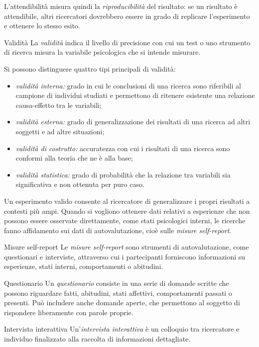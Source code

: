 \documentclass[a4paper]{article}
\begin{document}
L'attendibilità misura quindi la \emph{riproducibilità} del risultato: se un risultato è attendibile, altri ricercatori dovrebbero essere in grado di replicare l'esperimento e ottenere lo stesso esito.
\begin{snippetdefinition}{Validità}
    La \emph{validità} indica il livello di precisione con cui un test o uno strumento di ricerca misura la variabile psicologica che si intende misurare.
\end{snippetdefinition}
Si possono distinguere quattro tipi principali di validità:
\begin{itemize}
    \item \emph{validità interna:} grado in cui le conclusioni di una ricerca sono riferibili al campione di individui studiati e permettono di ritenere esistente una relazione causa-effetto tra le variabili;
    \item \emph{validità esterna:} grado di generalizzazione dei risultati di una ricerca ad altri soggetti e ad altre situazioni;
    \item \emph{validità di costrutto:} accuratezza con cui i risultati di una ricerca sono conformi alla teoria che ne è alla base;
    \item \emph{validità statistica:} grado di probabilità che la relazione tra variabili sia significativa e non ottenuta per puro caso.
\end{itemize}
Un esperimento valido consente al ricercatore di generalizzare i propri risultati a contesti più ampi.
Quando si vogliono ottenere dati relativi a esperienze che non possono essere osservate direttamente, come stati psicologici interni, le ricerche fanno affidamento sui dati di autovalutazione, cioè sulle \emph{misure self-report}.
\begin{snippetdefinition}{Misure self-report}
    Le \emph{misure self-report} sono strumenti di autovalutazione, come questionari e interviste, attraverso cui i partecipanti forniscono informazioni su esperienze, stati interni, comportamenti o abitudini.
\end{snippetdefinition}
\begin{snippetdefinition}{Questionario}
    Un \emph{questionario} consiste in una serie di domande scritte che possono riguardare fatti, abitudini, stati affettivi, comportamenti passati o presenti. Può includere anche domande aperte, che permettono al soggetto di rispondere liberamente con parole proprie.
\end{snippetdefinition}
\begin{snippetdefinition}{Intervista interattiva}
    Un'\emph{intervista interattiva} è un colloquio tra ricercatore e individuo finalizzato alla raccolta di informazioni dettagliate.
\end{snippetdefinition}
\end{document}
